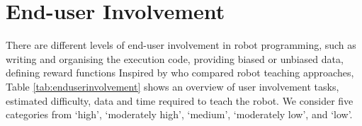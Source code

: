 



\section{End-user Involvement}\label{sssec:End-User Involvement}
There are different levels of end-user involvement in robot programming, such as writing and organising the execution code, providing biased or unbiased data, defining reward functions \etc 
Inspired by \cite{kormushev2013reinforcement} who compared robot teaching approaches,
Table \ref{tab:enduserinvolvement} shows an overview of user involvement tasks, estimated difficulty, data and time required to teach the robot.
We consider five categories from `high', `moderately high', `medium', `moderately low', and `low'.


